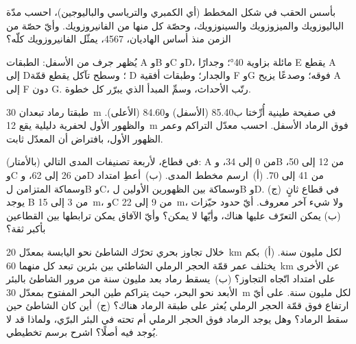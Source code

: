 \begin{exercise}[$\star$]\label{exo:b1:stratigraphic-scale:2}
بأسس الحقب في شكل المخطط (أي الكمبري والترياسي والباليوجين)، احسب مدّة الباليوزويك والميزوزويك والسينوزويك، وحصّة كل منها من الفانيروزويك. وأيّ حصّة من الزمن منذ أساس الهاديان، \qty{4567}{\Ma}، يمثّل الفانيروزويك كلّه؟
\end{exercise}

\begin{exercise}[$\star$]\label{exo:b1:stratigraphic-scale:3}
يُظهر جرف من الأسفل: الطبقات A وB وC وD، مائلة بزاوية \ang{40}؛ وجدارًا E يقطع A إلى D؛ وسطح تآكل يقطع قمّة D والجدار؛ وطبقات أفقية F وG فوقه؛ وصدعًا يزيح A إلى F دون G. رتّب الأحداث، وسمِّ المبدأ الذي يبرّر كل خطوة.
\end{exercise}

\begin{exercise}[$\star$]\label{exo:b1:stratigraphic-scale:4}
طبقتا رماد تبعدان \qty{30}{m} في صفيحة طينية أُرِّختا ب\qty{85.40}{\Ma} (الأسفل) و\qty{84.60}{\Ma} (الأعلى). والظهور الأول لحفرية دليلية يقع \qty{12}{m} فوق الرماد الأسفل. احسب معدّل التراكم وعمر الظهور الأول، بافتراض أن المعدّل ثابت.
\end{exercise}

\begin{exercise}[$\star\star$]\label{exo:b1:stratigraphic-scale:5}
في قطاع، لأربعة تصنيفات المدى التالي (بالأمتار): A من 0 إلى 34، وB من 12 إلى 50، وC من 26 إلى 62، وD من 41 إلى 70. (أ)~ارسم مخطط المدى. (ب)~أعطِ امتداد وسماكة  المتزامن لB وC، وسماكة  بين الظهورين الأولين لB وD. (ج)~في قطاع ثانٍ يوجد B من 3 إلى \qty{15}{m}، وC من 9 إلى \qty{22}{m}، ولا شيء آخر معروف. أيّ حدود حيّزات (ب) يمكن التعرّف عليها هناك، وأيّها لا يمكن؟ وأيّ الآفاق يمكن ترابطها بين القطاعين بأكبر ثقة؟
\end{exercise}

\begin{exercise}[$\star\star$]\label{exo:b1:stratigraphic-scale:6}
خلال تجاوز بحري تحرّك الشاطئ نحو اليابسة بمعدّل \qty{20}{km} لكل مليون سنة. (أ)~بكم يختلف عمر قمّة الحجر الرملي الشاطئي بين بئرين تبعد كل منهما \qty{60}{km} عن الأخرى على امتداد اتّجاه التجاوز؟ (ب)~يسقط رماد بعد مليون سنة من مرور الشاطئ بالبئر الأبعد نحو البحر، حيث يتراكم طين البحر المفتوح بمعدّل \qty{30}{m} لكل مليون سنة. على أيّ ارتفاع فوق قمّة الحجر الرملي يُعثر على طبقة الرماد هناك؟ (ج)~أين كان الشاطئ حين سقط الرماد؟ وهل يوجد الرماد فوق الحجر الرملي أم تحته في البئر البرّي، ولماذا قد لا يُوجد فيه أصلًا؟ اشرح برسم تخطيطي.
\end{exercise}

